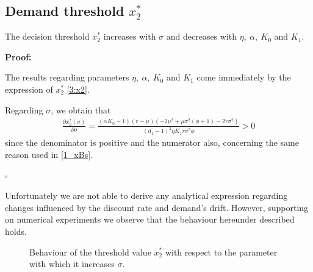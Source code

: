 \subsection{Demand threshold $x_2^*$}
	\label{3_dmx2}
	
\begin{prop}
	\label{3_propx2}
	The decision threshold $x_2^*$ increases with $\sigma$ and decreases with $\eta, \ \alpha, \ K_0$ and $K_1$.
\end{prop}

\textbf{Proof:}

The results regarding parameters $\eta, \ \alpha, \ K_0$ and $K_1$ come immediately by the expression of $x_2^*$  \eqref{3:x2}.

Regarding $\sigma$, we obtain that
\begin{align*}
\frac{\partial x_2^* ( \sigma) }{\partial \sigma}=
\frac{(\alpha  K_0-1) (r-\mu) \left(-2 \mu ^2+\mu  \sigma ^2 \left(\phi+1\right)-2 r \sigma ^2\right)}{(d_1-1)^2 \eta  K_1 r \sigma ^5 \phi}>0
\end{align*}
since the denominator is positive and the numerator also, concerning the same reason used in \eqref{1_xBs}.

\begin{flushright}
	$\square$
\end{flushright}


Unfortunately we are not able to derive any analytical expression regarding changes influenced by the discount rate and demand's drift. However, supporting on numerical experiments we observe that the behaviour hereunder described holds.

\begin{figure}[!htb]
	\begin{subfigmatrix}{1}
	\end{subfigmatrix}
	\caption{Behaviour of the threshold value $x^*_2$ with respect to the parameter with which it increases $\sigma$.}
	\label{fig:2_x2i}
\end{figure}

